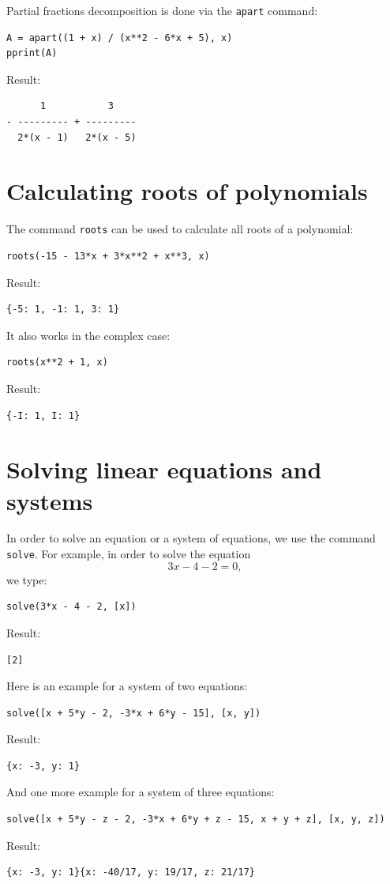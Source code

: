 \documentclass{article}
\begin{document}
Partial fractions decomposition is done via the {\tt apart} command:
\begin{verbatim}
A = apart((1 + x) / (x**2 - 6*x + 5), x)
pprint(A)
\end{verbatim}
Result:
\begin{verbatim}
      1           3    
- --------- + ---------
  2*(x - 1)   2*(x - 5)
\end{verbatim}

\section{Calculating roots of polynomials}

The command {\tt roots} can be used to calculate all roots of a polynomial:
\begin{verbatim}
roots(-15 - 13*x + 3*x**2 + x**3, x)
\end{verbatim}
Result:
\begin{verbatim}
{-5: 1, -1: 1, 3: 1}
\end{verbatim}
It also works in the complex case:
\begin{verbatim}
roots(x**2 + 1, x)
\end{verbatim}
Result:
\begin{verbatim}
{-I: 1, I: 1}
\end{verbatim}


\section{Solving linear equations and systems}

In order to solve an equation or a system of equations, we use the command {\tt solve}.
For example, in order to solve the equation 
$$
3x - 4 - 2 = 0,
$$
we type:
\begin{verbatim}
solve(3*x - 4 - 2, [x])
\end{verbatim}
Result:
\begin{verbatim}
[2]
\end{verbatim}
\noindent
Here is an example for a system of two equations:
\begin{verbatim}
solve([x + 5*y - 2, -3*x + 6*y - 15], [x, y])
\end{verbatim}
Result:
\begin{verbatim}
{x: -3, y: 1}
\end{verbatim}
And one more example for a system of three equations:
\begin{verbatim}
solve([x + 5*y - z - 2, -3*x + 6*y + z - 15, x + y + z], [x, y, z])
\end{verbatim}
Result:
\begin{verbatim}
{x: -3, y: 1}{x: -40/17, y: 19/17, z: 21/17}
\end{verbatim}
\noindent
\end{document}

